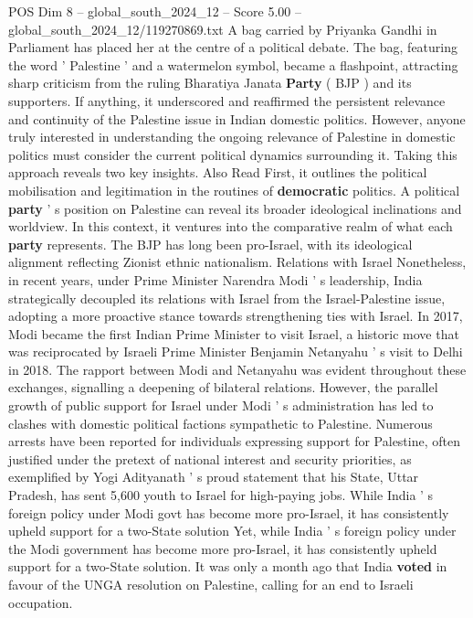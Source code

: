 \begin{textsample}{POS Dim 8 – global\_south\_2024\_12 – Score 5.00 – global\_south\_2024\_12/119270869.txt}  \label{ex:f8_pos_355}
A bag carried by Priyanka Gandhi in Parliament has placed her at the centre of a political debate.
The bag, featuring the word ' Palestine ' and a watermelon symbol, became a flashpoint, attracting sharp criticism from the ruling Bharatiya Janata \textbf{Party} ( BJP ) and its supporters.
If anything, it underscored and reaffirmed the persistent relevance and continuity of the Palestine issue in Indian domestic politics.
However, anyone truly interested in understanding the ongoing relevance of Palestine in domestic politics must consider the current political dynamics surrounding it.
Taking this approach reveals two key insights.
Also Read First, it outlines the political mobilisation and legitimation in the routines of \textbf{democratic} politics.
A political \textbf{party} ' s position on Palestine can reveal its broader ideological inclinations and worldview.
In this context, it ventures into the comparative realm of what each \textbf{party} represents.
The BJP has long been pro-Israel, with its ideological alignment reflecting Zionist ethnic nationalism.
Relations with Israel Nonetheless, in recent years, under Prime Minister Narendra Modi ' s leadership, India strategically decoupled its relations with Israel from the Israel-Palestine issue, adopting a more proactive stance towards strengthening ties with Israel.
In 2017, Modi became the first Indian Prime Minister to visit Israel, a historic move that was reciprocated by Israeli Prime Minister Benjamin Netanyahu ' s visit to Delhi in 2018.
The rapport between Modi and Netanyahu was evident throughout these exchanges, signalling a deepening of bilateral relations.
However, the parallel growth of public support for Israel under Modi ' s administration has led to clashes with domestic political factions sympathetic to Palestine.
Numerous arrests have been reported for individuals expressing support for Palestine, often justified under the pretext of national interest and security priorities, as exemplified by Yogi Adityanath ' s proud statement that his State, Uttar Pradesh, has sent 5,600 youth to Israel for high-paying jobs.
While India ' s foreign policy under Modi govt has become more pro-Israel, it has consistently upheld support for a two-State solution Yet, while India ' s foreign policy under the Modi government has become more pro-Israel, it has consistently upheld support for a two-State solution.
It was only a month ago that India \textbf{voted} in favour of the UNGA resolution on Palestine, calling for an end to Israeli occupation.

\end{textsample}
